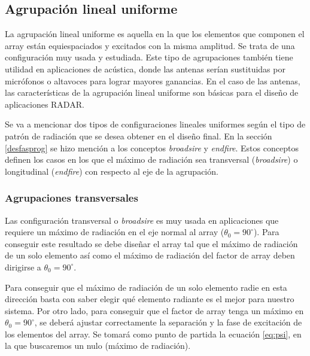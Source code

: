 \subsection{Agrupación lineal uniforme}
\par La agrupación lineal uniforme es aquella en la que los elementos que componen el array están equiespaciados y excitados con la misma amplitud. Se trata de una configuración muy usada y estudiada. Este tipo de agrupaciones también tiene utilidad en aplicaciones de acústica, donde las antenas serían sustituidas por micrófonos o altavoces para lograr mayores ganancias. En el caso de las antenas, las características de la agrupación lineal uniforme son básicas para el diseño de aplicaciones RADAR. 
\\
\par Se va a mencionar dos tipos de configuraciones lineales uniformes según el tipo de patrón de radiación que se desea obtener en el diseño final. En la sección \ref{desfasprog} se hizo mención a los conceptos \textit{broadsire} y \textit{endfire}. Estos conceptos definen los casos en los que el máximo de radiación sea transversal (\textit{broadsire}) o longitudinal (\textit{endfire}) con respecto al eje de la agrupación. \cite{Cardama2002}

\subsubsection{Agrupaciones transversales}

\par Las configuración transversal o \textit{broadsire} es muy usada en aplicaciones que requiere un máximo de radiación en el eje normal al array ($\theta_{0}=90^{\circ}$). Para conseguir este resultado se debe diseñar el array tal que el máximo de radiación de un solo elemento así como el máximo de radiación del factor de array deben dirigirse a $\theta_{0}=90^{\circ}$. \cite{Balanis2015} 
\\
\par Para conseguir que el máximo de radiación de un solo elemento radie en esta dirección basta con saber elegir qué elemento radiante es el mejor para nuestro sistema. Por otro lado, para conseguir que el factor de array tenga un máximo en $\theta_{0}=90^{\circ}$, se deberá ajustar correctamente la separación y la fase de excitación de los elementos del array. Se tomará como punto de partida la ecuación \ref{eq:psi}, en la que buscaremos un nulo (máximo de radiación). \cite{Balanis2015} 

